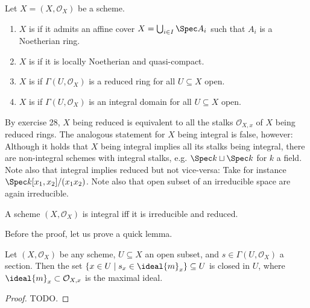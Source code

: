\documentclass[wip, algebra]{bsteffan-lecturenotes}
\newcommand{\cO}{\mathcal{O}}
\begin{document}
\begin{definition}
	Let $X = (X, \cO_X)$ be a scheme.
	\begin{enumerate}
		\item $X$ is  if it admits an affine cover $X = \bigcup_{i \in I} \Spec A_i$ such that $A_i$ is a Noetherian ring.
		\item $X$ is  if it is locally Noetherian and quasi-compact.
		\item $X$ is  if $\Gamma(U, \cO_X)$ is a reduced ring for all $U \subseteq X$ open.
		\item $X$ is  if $\Gamma(U, \cO_X)$ is an integral domain for all $U \subseteq X$ open.	
	\end{enumerate}
\end{definition}
By exercise 28, $X$ being reduced is equivalent to all the stalks $\cO_{X, x}$ of $X$ being reduced rings.
The analogous statement for $X$ being integral is false, however: 
Although it holds that $X$ being integral implies all its stalks being integral, there are non-integral schemes with integral stalks, e.g. $\Spec k \sqcup \Spec k$ for $k$ a field.
Note also that integral implies reduced but not vice-versa: 
Take for instance $\Spec k[x_1, x_2] / (x_1 x_2)$.
Note also that open subset of an irreducible space are again irreducible.
\begin{proposition}
	A scheme $(X, \cO_X)$ is integral iff it is irreducible and reduced.
\end{proposition}
Before the proof, let us prove a quick lemma.
\begin{lemma}
	Let $(X, \cO_X)$ be any scheme, $U \subseteq X$ an open subset, and $s \in \Gamma(U, \cO_X)$ a section.
	Then the set $\{x \in U \mid s_x \in \ideal{m}_x\} \subseteq U$ is closed in $U$, where $\ideal{m}_x \subset \cO_{X, x}$ is the maximal ideal.
\end{lemma}
\begin{proof}
	TODO.
\end{proof}
\end{document}
